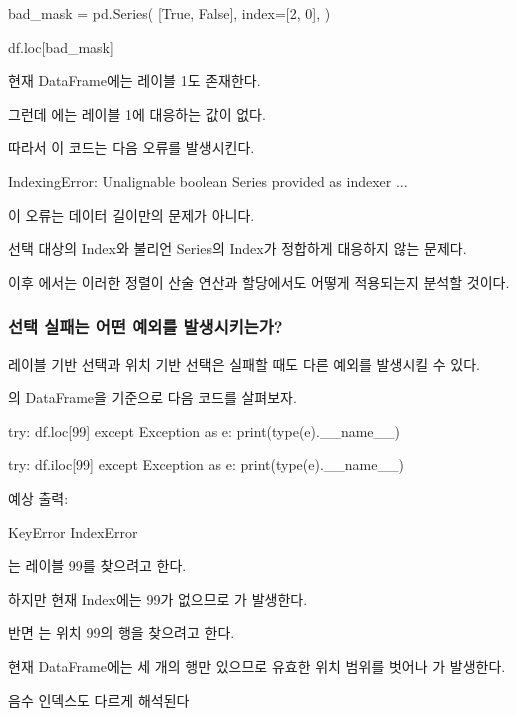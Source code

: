 \begin{dhkcode}
bad_mask = pd.Series(
    [True, False],
    index=[2, 0],
)

df.loc[bad_mask]
\end{dhkcode}

현재 DataFrame에는 레이블 1도 존재한다.

그런데 에는 레이블 1에 대응하는 값이 없다.

따라서 이 코드는 다음 오류를 발생시킨다.

\begin{dhkzsh}
IndexingError: Unalignable boolean Series provided as indexer ...
\end{dhkzsh}

이 오류는 데이터 길이만의 문제가 아니다.

선택 대상의 Index와 불리언 Series의 Index가 정합하게 대응하지 않는 문제다.

이후 에서는 이러한 정렬이 산술 연산과 할당에서도 어떻게 적용되는지 분석할 것이다.

\subsubsection{선택 실패는 어떤 예외를 발생시키는가?}

레이블 기반 선택과 위치 기반 선택은 실패할 때도 다른 예외를 발생시킬 수 있다.

의 DataFrame을 기준으로 다음 코드를 살펴보자.

\begin{dhkcode}
try:
    df.loc[99]
except Exception as e:
    print(type(e).__name__)

try:
    df.iloc[99]
except Exception as e:
    print(type(e).__name__)
\end{dhkcode}

예상 출력:

\begin{dhkzsh}
KeyError
IndexError
\end{dhkzsh}

는 레이블 99를 찾으려고 한다.

하지만 현재 Index에는 99가 없으므로 가 발생한다.

반면 는 위치 99의 행을 찾으려고 한다.

현재 DataFrame에는 세 개의 행만 있으므로 유효한 위치 범위를 벗어나 가 발생한다.

\begin{dhknote}
\begin{dhksmry}[centered]
음수 인덱스도 다르게 해석된다
\end{dhksmry}
\end{dhknote}

